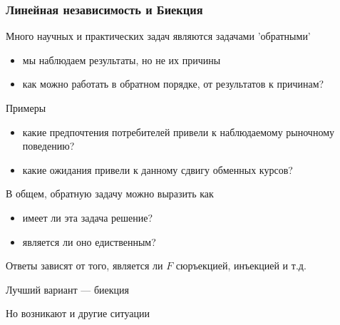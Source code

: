 \begin{frame}
    
    \frametitle{Линейная независимость и Биекция}

    \vspace{.7em}
    Много научных и практических задач являются задачами 'обратными'

    \begin{itemize}
        \item мы наблюдаем результаты, но не их причины
        \item как можно работать в обратном порядке, от результатов к причинам?
    \end{itemize}
    
    Примеры

    \begin{itemize}
        \item какие предпочтения потребителей привели к наблюдаемому рыночному поведению?
        \item какие ожидания привели к данному сдвигу обменных курсов?
    \end{itemize}

\end{frame}

\begin{frame}
    
    \vspace{2em}
    В общем, обратную задачу можно выразить как
    
    \begin{figure}
       \begin{center}
        \scalebox{.5}{}
       \end{center}
    \end{figure}

    \begin{itemize}
        \item имеет ли эта задача решение?
        \item является ли оно едиственным?
    \end{itemize}

    Ответы зависят от того, является ли $F$ сюръекцией, инъекцией и т.д. 

    Лучший вариант --- биекция

    Но возникают и другие ситуации

\end{frame}


